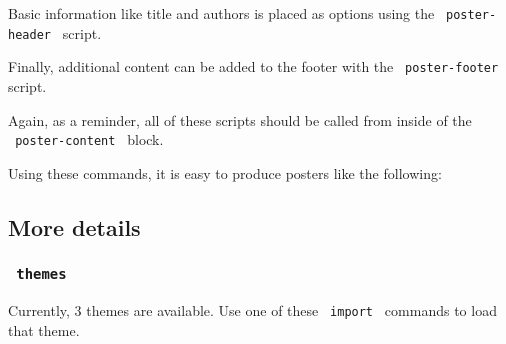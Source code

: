 \begin{Shaded}
\begin{Highlighting}[]
\end{Highlighting}
\end{Shaded}

Basic information like title and authors is placed as options using the
\texttt{\ poster-header\ } script.

\begin{Shaded}
\begin{Highlighting}[]
\NormalTok{)}
\end{Highlighting}
\end{Shaded}

Finally, additional content can be added to the footer with the
\texttt{\ poster-footer\ } script.

\begin{Shaded}
\begin{Highlighting}[]
\end{Highlighting}
\end{Shaded}

Again, as a reminder, all of these scripts should be called from inside
of the \texttt{\ poster-content\ } block.

Using these commands, it is easy to produce posters like the following:

\subsection{More details}\label{more-details}

\subsubsection{\texorpdfstring{\texttt{\ themes\ }}{ themes }}\label{themes}

Currently, 3 themes are available. Use one of these \texttt{\ import\ }
commands to load that theme.

\begin{Shaded}
\begin{Highlighting}[]
\end{Highlighting}
\end{Shaded}

